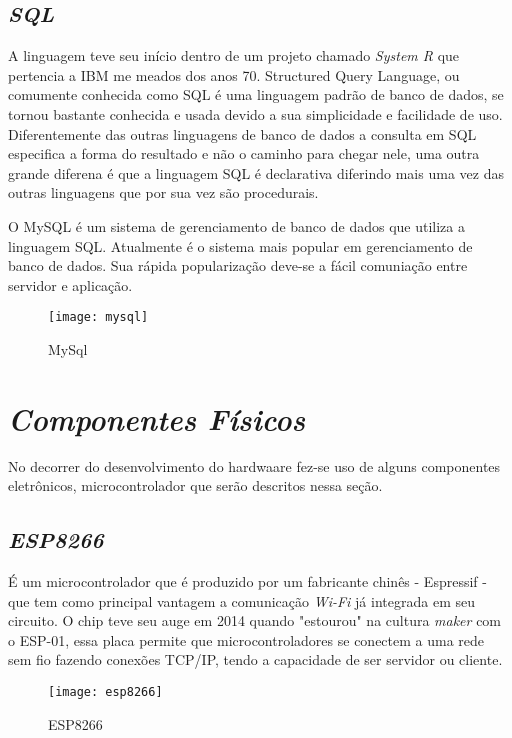 \subsection[\textit{SQL}]{\textit{SQL}}\label{sql}
A linguagem teve seu início dentro de um projeto chamado \textit{System R} que pertencia a IBM me meados dos anos 70. Structured Query Language, ou
comumente conhecida como SQL é uma linguagem padrão de banco de dados, se tornou bastante conhecida e usada devido a sua simplicidade e facilidade 
de uso. Diferentemente das outras linguagens de banco de dados a consulta em SQL especifica a forma do resultado e não o caminho para chegar nele, uma outra
grande diferena é que a linguagem SQL é declarativa diferindo mais uma vez das outras linguagens que por sua vez são procedurais.

O MySQL é um sistema de gerenciamento de banco de dados que utiliza a linguagem SQL. Atualmente é o sistema mais popular em gerenciamento de 
banco de dados. Sua rápida popularização deve-se a fácil comuniação entre servidor e aplicação. 

\begin{figure}[h!]
	\texttt{[image: mysql]}
	\centering
	\caption[MySQL]{MySql}
	\label{fig:mysql-image}
\end{figure}
\FloatBarrier


\section[\textit{Componentes Físicos}]{\textit{Componentes Físicos}}\label{comp-fisico}
No decorrer do desenvolvimento do hardwaare fez-se uso de alguns componentes eletrônicos, microcontrolador que serão descritos nessa seção.
\subsection[\textit{ESP8266}]{\textit{ESP8266}}\label{esp}
É um microcontrolador que é produzido por um fabricante chinês - Espressif - que tem como principal vantagem a comunicação \textit{Wi-Fi} já integrada em seu circuito.
O chip teve seu auge em 2014 quando "estourou" na cultura \textit{maker} com o ESP-01, essa placa permite que microcontroladores se conectem a uma rede
sem fio  fazendo conexões TCP/IP, tendo a capacidade de ser servidor ou cliente.

\begin{figure}[h!]
	\texttt{[image: esp8266]}
	\centering
	\caption[ESP8266]{ESP8266}
	\label{fig:esp8266}
\end{figure}
\FloatBarrier

